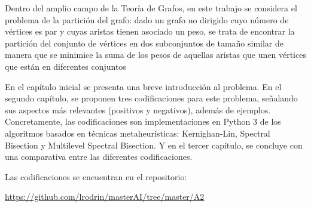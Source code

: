Dentro del amplio campo de la Teoría de Grafos, en este trabajo se considera el problema de la partición del grafo: dado un grafo no dirigido cuyo número de vértices es par y cuyas aristas tienen asociado un peso, se trata de encontrar la partición del conjunto de vértices en dos subconjuntos de tamaño similar de manera que se minimice la suma de los pesos de aquellas aristas que unen vértices que están en diferentes conjuntos

En el capítulo inicial se presenta una breve introducción al problema. En el segundo capítulo, se proponen tres codificaciones para este problema, señalando sus aspectos más relevantes (positivos y negativos), además de ejemplos. Concretamente, las codificaciones son implementaciones en Python 3 de los algoritmos basados en técnicas metaheurísticas: Kernighan-Lin, Spectral Bisection y Multilevel Spectral Bisection. Y en el tercer capítulo, se concluye con una comparativa entre las diferentes codificaciones.

Las codificaciones se encuentran en el repositorio:

\begin{center}
	\url{https://github.com/lrodrin/masterAI/tree/master/A2}
\end{center}
